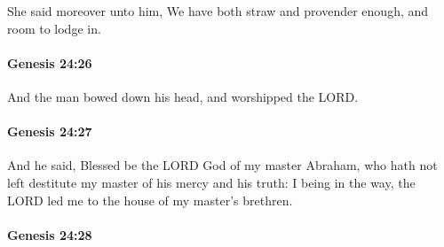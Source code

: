 			She said moreover unto him, We have both straw and provender enough, and room to lodge in.


		\paragraph{Genesis 24:26} %
			\label{GENESIS-24-26}

			And the man bowed down his head, and worshipped the LORD.


		\paragraph{Genesis 24:27} %
			\label{GENESIS-24-27}

			And he said, Blessed be the LORD God of my master Abraham, who hath not left destitute my master of his mercy and his truth: I being in the way, the LORD led me to the house of my master's brethren.


		\paragraph{Genesis 24:28} %
			\label{GENESIS-24-28}

